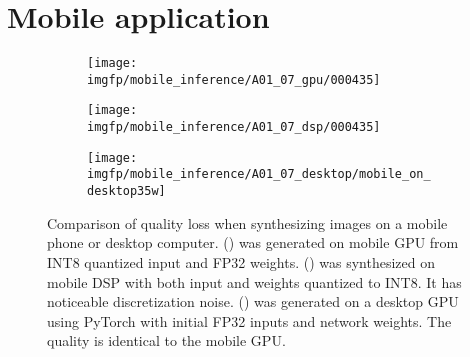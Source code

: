 \section{Mobile application}
\label{appb:mobile-screenshots}

\begin{figure}[h]
	\centering
	\begin{subfigure}[b]{0.32\textwidth}
		\centering
		\texttt{[image: \\imgfp/mobile\_inference/A01\_07\_gpu/000435]}%
		\caption{}
		\label{fig:infer_gpu}
	\end{subfigure}
	\hfill
	\begin{subfigure}[b]{0.32\textwidth}
		\centering
		\texttt{[image: \\imgfp/mobile\_inference/A01\_07\_dsp/000435]}
		\caption{}
		\label{fig:infer_dsp}
	\end{subfigure}
	\hfill
	\begin{subfigure}[b]{0.32\textwidth}
		\centering
		\texttt{[image: \\imgfp/mobile\_inference/A01\_07\_desktop/mobile\_on\_desktop35w]}
		\caption{}
		\label{fig:infer_desktop}
	\end{subfigure}
	\caption{Comparison of quality loss when synthesizing images on a mobile phone or desktop computer. (\protect{}) was generated on mobile GPU from INT8 quantized input and FP32 weights. (\protect{}) was synthesized on mobile DSP with both input and weights quantized to INT8. It has noticeable discretization noise. (\protect{}) was generated on a desktop GPU using PyTorch with initial FP32 inputs and network weights. The quality is identical to the mobile GPU.}
\end{figure}
